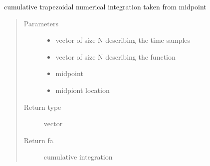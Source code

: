 \documentclass[letterpaper,10pt,english]{sphinxmanual}
\begin{document}

\begin{fulllineitems}
\label{\detokenize{utility_functions:utility_functions.cumtrapzmid}}
cumulative trapezoidal numerical integration taken from midpoint
\begin{quote}\begin{description}
\item[{Parameters}] \leavevmode\begin{itemize}
\item {} 
 \textendash{} vector of size N describing the time samples

\item {} 
 \textendash{} vector of size N describing the function

\item {} 
 \textendash{} midpoint

\item {} 
 \textendash{} midpiont location

\end{itemize}

\item[{Return type}] \leavevmode
vector

\item[{Return fa}] \leavevmode
cumulative integration

\end{description}\end{quote}

\end{fulllineitems}

\end{document}
